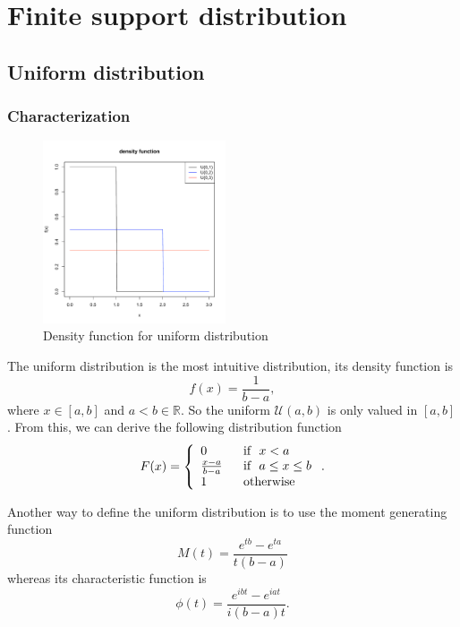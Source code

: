 \chapter{Finite support distribution}
\section{Uniform distribution}
\subsection{Characterization}
\begin{figure}
  \vspace{-20pt}
  \begin{center}
    \includegraphics[width=0.48\textwidth]{img/unifzoom}
  \end{center}
  \vspace{-20pt}  
  \caption{Density function for uniform distribution}
  \vspace{-20pt}  
\end{figure}

The uniform distribution is the most intuitive distribution, its density function is 
$$
f(x) = \frac{1}{b-a},
$$
where $x\in [a,b]$ and $a<b\in \mathbb R$. So the uniform $\mathcal U(a,b)$ is only valued in $[a,b]$.
From this, we can derive the following distribution function
$$
F(x) = \left\{
\begin{array}{ll}
0 & \textrm{~~if~~} x<a\\
\frac{x-a}{b-a} & \textrm{~~if~~} a\leq x\leq b\\
1 & \textrm{~~otherwise~~}\\
\end{array}
\right. .
$$

Another way to define the uniform distribution is to use the moment generating function
$$
M(t) = \frac{e^{tb}-e^{ta}}{t(b-a)}
$$
whereas its characteristic function is 
$$
\phi(t) = \frac{e^{ibt}-e^{iat}}{i(b-a)t}.
$$

